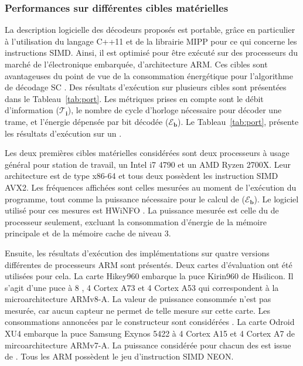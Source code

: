 \subsubsection{Performances sur différentes cibles matérielles}

La description logicielle des décodeurs proposés est portable, grâce en particulier à l'utilisation du langage C++11 et de la librairie MIPP \cite{cassagne2018mipp} pour ce qui concerne les instructions SIMD. Ainsi, il est optimisé pour être exécuté sur des processeurs du marché de l'électronique embarquée, d'architecture ARM. Ces cibles sont avantageuses du point de vue de la consommation énergétique pour l'algorithme de décodage SC \cite{cassagne_energy_2016}. Des résultats d'exécution sur plusieurs cibles sont présentées dans le Tableau~\ref{tab:port}. Les métriques prises en compte sont le débit d'information ($\bm{\mathcal{T}_i}$), le nombre de cycle d'horloge nécessaire pour décoder une trame, et l'énergie dépensée par bit décodée ($\bm{\mathcal{E}_b}$). Le Tableau~\ref{tab:port}, présente les résultats d'exécution sur un \coeur.

Les deux premières cibles matérielles considérées sont deux processeurs à usage général pour station de travail, un Intel i7 4790 et un AMD Ryzen 2700X. Leur architecture est de type x86-64 et tous deux possèdent les instruction SIMD AVX2. Les fréquences affichées sont celles mesurées au moment de l'exécution du programme, tout comme la puissance nécessaire pour le calcul de ($\bm{\mathcal{E}_b}$). Le logiciel utilisé pour ces mesures est HWiNFO \cite{noauthor_hwinfo_nodate}. La puissance mesurée est celle du \coeur de processeur seulement, excluant la consommation d'énergie de la mémoire principale et de la mémoire cache de niveau 3.

Ensuite, les résultats d'exécution des implémentations sur quatre versions différentes de processeurs ARM sont présentés. Deux cartes d'évaluation ont été utilisées pour cela. La carte Hikey960 embarque la puce Kirin960 de Hisilicon. Il s'agit d'une puce à 8 \coeurs, 4 Cortex A73 et 4 Cortex A53 qui correspondent à la microarchitecture ARMv8-A. La valeur de puissance consommée n'est pas mesurée, car aucun capteur ne permet de telle mesure sur cette carte. Les consommations annoncées par le constructeur sont considérées \cite{humrick_hisilicon_nodate}. La carte Odroid XU4 embarque la puce Samsung Exynos 5422 à 4 \coeurs Cortex A15 et 4 \coeurs Cortex A7 de mircoarchitecture ARMv7-A. La puissance considérée pour chacun des \coeurs est issue de \cite{holmgren_energy_nodate,benmoussa_performance_nodate}. Tous les \coeurs ARM possèdent le jeu d'instruction SIMD NEON.

